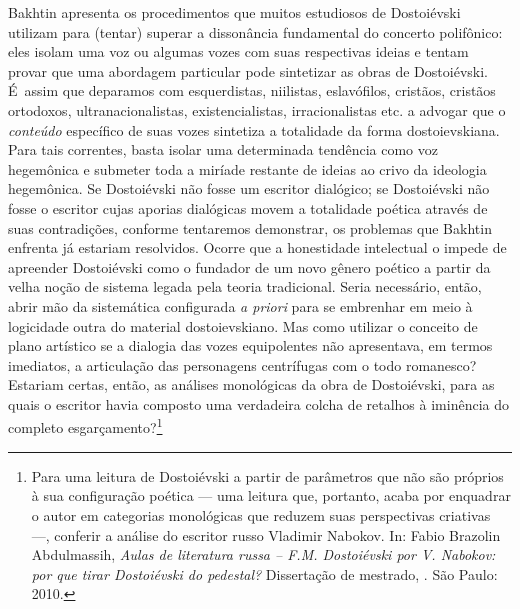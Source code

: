 Bakhtin apresenta os procedimentos que muitos estudiosos de Dostoiévski
utilizam para (tentar) superar a dissonância fundamental do concerto
polifônico: eles isolam uma voz ou algumas vozes com suas respectivas
ideias e tentam provar que uma abordagem particular pode sintetizar as
obras de Dostoiévski. É~assim que deparamos com esquerdistas, niilistas,
eslavófilos, cristãos, cristãos ortodoxos, ultranacionalistas,
existencialistas, irracionalistas etc. a advogar que o \emph{conteúdo}
específico de suas vozes sintetiza a totalidade da forma dostoievskiana.
Para tais correntes, basta isolar uma determinada tendência como voz
hegemônica e submeter toda a miríade restante de ideias ao crivo da
ideologia hegemônica. Se Dostoiévski não fosse um escritor dialógico; se
Dostoiévski não fosse o escritor cujas aporias dialógicas movem a
totalidade poética através de suas contradições, conforme tentaremos
demonstrar, os problemas que Bakhtin enfrenta já estariam resolvidos.
Ocorre que a honestidade intelectual o impede de apreender Dostoiévski
como o fundador de um novo gênero poético a partir da velha noção de
sistema legada pela teoria tradicional. Seria necessário, então, abrir
mão da sistemática configurada \emph{a priori} para se embrenhar em meio
à logicidade outra do material dostoievskiano. Mas como utilizar o
conceito de plano artístico se a dialogia das vozes equipolentes não
apresentava, em termos imediatos, a articulação das personagens
centrífugas com o todo romanesco? Estariam certas, então, as análises
monológicas da obra de Dostoiévski, para as quais o escritor havia
composto uma verdadeira colcha de retalhos à iminência do completo
esgarçamento?\footnote{Para uma leitura de Dostoiévski a partir de
  parâmetros que não são próprios à sua configuração poética --- uma
  leitura que, portanto, acaba por enquadrar o autor em categorias
  monológicas que reduzem suas perspectivas criativas ---, conferir a
  análise do escritor russo Vladimir Nabokov. In: Fabio Brazolin
  Abdulmassih, \emph{Aulas de literatura russa -- F.M. Dostoiévski por
  V. Nabokov: por que tirar Dostoiévski do pedestal?} Dissertação de
  mestrado, . São Paulo: 2010.}

